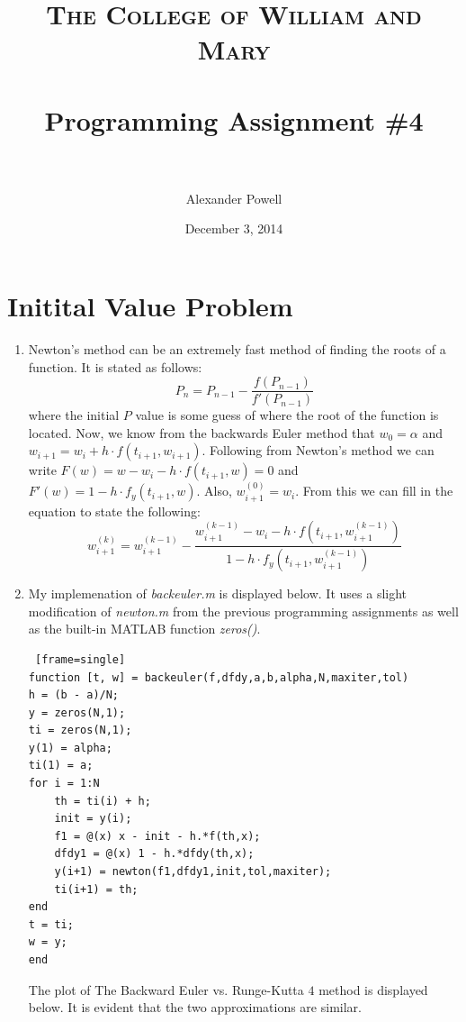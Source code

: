 \documentclass[paper=a4, fontsize=11pt]{scrartcl} %
\title{	
\normalfont \normalsize 
\textsc{The College of William and Mary} \\ [25pt] %
\horrule{0.5pt} \\[0.4cm] %
\huge Programming Assignment \#4 \\ %
\horrule{2pt} \\[0.5cm] %
}
\author{Alexander Powell} %
\date{\normalsize December 3, 2014} %
\numberwithin{equation}{section} %
\numberwithin{figure}{section} %
\numberwithin{table}{section} %
\begin{document}
\lstset{language=MATLAB}

\maketitle %


\section{Initital Value Problem}
\begin{enumerate}

\item
Newton's method can be an extremely fast method of finding the roots of a function.  It is stated as follows:
$$P_{n} = P_{n-1} - \frac{f(P_{n-1})}{f'(P_{n-1})}$$
where the initial $P$ value is some guess of where the root of the function is located.  Now, we know from the backwards Euler method that $w_{0} = \alpha$ and $w_{i+1} = w_i + h \cdot f(t_{i+1},w_{i+1})$.  Following from Newton's method we can write $F(w) = w - w_i - h \cdot f(t_{i+1},w) = 0$ and $F'(w) = 1 - h \cdot f_{y}(t_{i+1},w)$.  Also, $w_{i+1}^{(0)} = w_i$.  From this we can fill in the equation to state the following:
$$w_{i+1}^{(k)} = w_{i+1}^{(k-1)} - \frac{w_{i+1}^{(k-1)} - w_i - h \cdot f(t_{i+1},w_{i+1}^{(k-1)})}{1 - h \cdot f_y(t_{i+1},w_{i+1}^{(k-1)})}$$

\clearpage

\item
My implemenation of \textit{backeuler.m} is displayed below.  It uses a slight modification of \textit{newton.m} from the previous programming assignments as well as the built-in MATLAB function \textit{zeros()}.  

\begin{lstlisting} [frame=single]
function [t, w] = backeuler(f,dfdy,a,b,alpha,N,maxiter,tol)
h = (b - a)/N;
y = zeros(N,1);
ti = zeros(N,1);
y(1) = alpha;
ti(1) = a;
for i = 1:N
    th = ti(i) + h;
    init = y(i);
    f1 = @(x) x - init - h.*f(th,x);
    dfdy1 = @(x) 1 - h.*dfdy(th,x);
    y(i+1) = newton(f1,dfdy1,init,tol,maxiter);
    ti(i+1) = th;
end
t = ti;
w = y;
end
\end{lstlisting}

\clearpage

The plot of The Backward Euler vs. Runge-Kutta $4$ method is displayed below.  It is evident that the two approximations are similar.  


\end{enumerate}
\end{document}

